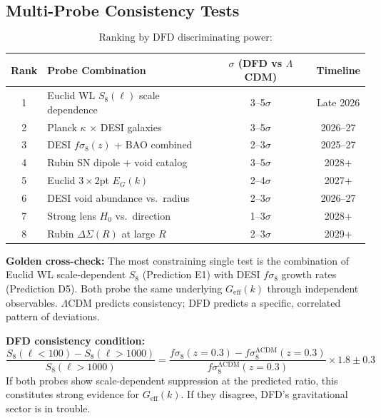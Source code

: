 \documentclass[12pt]{article}
\newcommand{\LCDM}{$\Lambda$CDM}
\begin{document}
\subsection{Multi-Probe Consistency Tests}

\begin{crossbox}
\begin{equation}
\boxed{
\text{Ranking by DFD discriminating power:}
}
\end{equation}
\begin{center}
\begin{tabular}{clcc}
\toprule
\textbf{Rank} & \textbf{Probe Combination} & \textbf{$\sigma$ (DFD vs \LCDM)} & \textbf{Timeline} \\
\midrule
1 & Euclid WL $S_8(\ell)$ scale dependence & 3--5$\sigma$ & Late 2026 \\
2 & Planck $\kappa$ $\times$ DESI galaxies & 3--5$\sigma$ & 2026--27 \\
3 & DESI $f\sigma_8(z)$ + BAO combined & 2--3$\sigma$ & 2025--27 \\
4 & Rubin SN dipole + void catalog & 3--5$\sigma$ & 2028+ \\
5 & Euclid $3\times2$pt $E_G(k)$ & 2--4$\sigma$ & 2027+ \\
6 & DESI void abundance vs.\ radius & 2--3$\sigma$ & 2026--27 \\
7 & Strong lens $H_0$ vs.\ direction & 1--3$\sigma$ & 2028+ \\
8 & Rubin $\Delta\Sigma(R)$ at large $R$ & 2--3$\sigma$ & 2029+ \\
\bottomrule
\end{tabular}
\end{center}

\medskip\noindent
\textbf{Golden cross-check:} The most constraining single test is the combination of Euclid WL scale-dependent $S_8$ (Prediction E1) with DESI $f\sigma_8$ growth rates (Prediction D5). Both probe the same underlying $G_\mathrm{eff}(k)$ through independent observables. \LCDM{} predicts consistency; DFD predicts a specific, correlated pattern of deviations.

\medskip\noindent
\textbf{DFD consistency condition:}
\begin{equation}
\frac{S_8(\ell < 100) - S_8(\ell > 1000)}{S_8(\ell > 1000)} = \frac{f\sigma_8(z=0.3) - f\sigma_8^\mathrm{\Lambda CDM}(z=0.3)}{f\sigma_8^\mathrm{\Lambda CDM}(z=0.3)} \times 1.8 \pm 0.3
\end{equation}
If both probes show scale-dependent suppression at the predicted ratio, this constitutes strong evidence for $G_\mathrm{eff}(k)$. If they disagree, DFD's gravitational sector is in trouble.
\end{crossbox}
\end{document}
